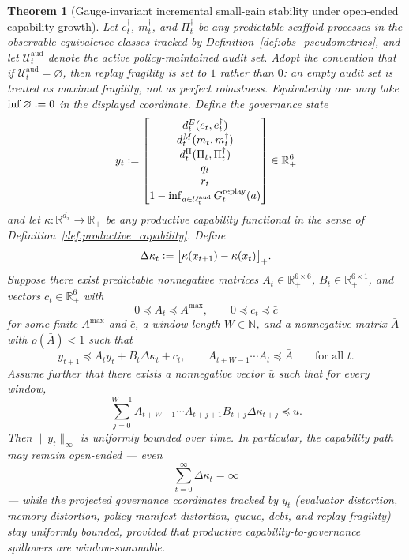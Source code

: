 \documentclass[11pt]{article}
\newtheorem{theorem}{Theorem}[section]
\theoremstyle{definition}
\newcommand{\R}{\mathbb{R}}
\newcommand{\N}{\mathbb{N}}
\newcommand{\1}{\mathbf{1}}
\newcommand{\Defeq}{\vcentcolon=}
\begin{document}
\begin{theorem}[Gauge-invariant incremental small-gain stability under open-ended capability growth]\label{thm:incremental_open}
Let $e_t^{\dagger}$, $m_t^{\dagger}$, and $\Pi_t^{\dagger}$ be any predictable scaffold processes in the observable equivalence classes tracked by Definition~\ref{def:obs_pseudometrics}, and let $\mathcal U_t^{\mathrm{aud}}$ denote the active policy-maintained audit set. Adopt the convention that if $\mathcal U_t^{\mathrm{aud}}=\varnothing$, then replay fragility is set to $1$ rather than $0$: an empty audit set is treated as maximal fragility, not as perfect robustness. Equivalently one may take $\inf \varnothing\Defeq 0$ in the displayed coordinate. Define the governance state
\[
y_t\Defeq \begin{bmatrix}
d_t^{E}(e_t,e_t^{\dagger})\\
d_t^{M}(m_t,m_t^{\dagger})\\
d_t^{\Pi}(\Pi_t,\Pi_t^{\dagger})\\
q_t\\
r_t\\
1-\inf_{a\in\mathcal U_t^{\mathrm{aud}}}G_t^{\mathrm{replay}}(a)
\end{bmatrix}\in\R_+^6
\]
and let $\kappa:\R^{d_x}\to\R_+$ be any productive capability functional in the sense of Definition~\ref{def:productive_capability}. Define
\[
\Delta \kappa_t\Defeq \bigl[\kappa(x_{t+1})-\kappa(x_t)\bigr]_+.
\]
Suppose there exist predictable nonnegative matrices $A_t\in\R_+^{6\times 6}$, $B_t\in\R_+^{6\times 1}$, and vectors $c_t\in\R_+^6$ with
\[
0\preceq A_t\preceq A^{\max},\qquad 0\preceq c_t\preceq \bar c
\]
for some finite $A^{\max}$ and $\bar c$, a window length $W\in\N$, and a nonnegative matrix $\bar A$ with $\rho(\bar A)<1$ such that
\[
y_{t+1}\preceq A_t y_t + B_t\Delta \kappa_t + c_t,
\qquad
A_{t+W-1}\cdots A_t \preceq \bar A
\qquad\text{for all }t.
\]
Assume further that there exists a nonnegative vector $\bar u$ such that for every window,
\[
\sum_{j=0}^{W-1}
A_{t+W-1}\cdots A_{t+j+1} B_{t+j}\Delta \kappa_{t+j}
\preceq \bar u.
\]
Then $\|y_t\|_\infty$ is uniformly bounded over time. In particular, the capability path may remain open-ended --- even
\[
\sum_{t=0}^{\infty}\Delta \kappa_t = \infty
\]
--- while the \emph{projected governance coordinates tracked by $y_t$} (evaluator distortion, memory distortion, policy-manifest distortion, queue, debt, and replay fragility) stay uniformly bounded, provided that productive capability-to-governance spillovers are window-summable.
\end{theorem}
\end{document}
